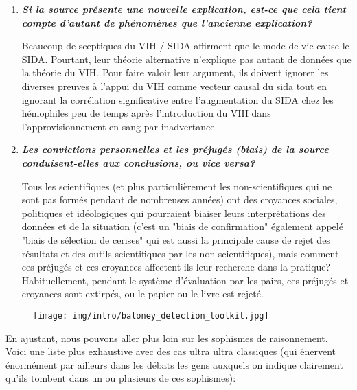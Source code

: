 \begin{enumerate}
		\item \textit{\textbf{Si la source présente une nouvelle explication, est-ce que cela tient compte d'autant de phénomènes que l'ancienne explication?}}
	
		Beaucoup de sceptiques du VIH / SIDA affirment que le mode de vie cause le SIDA. Pourtant, leur théorie alternative n'explique pas autant de données que la théorie du VIH. Pour faire valoir leur argument, ils doivent ignorer les diverses preuves à l'appui du VIH comme vecteur causal du sida tout en ignorant la corrélation significative entre l'augmentation du SIDA chez les hémophiles peu de temps après l'introduction du VIH dans l'approvisionnement en sang par inadvertance.

		\item \textit{\textbf{Les convictions personnelles et les préjugés (biais) de la source conduisent-elles aux conclusions, ou vice versa?}}

		Tous les scientifiques (et plus particulièrement les non-scientifiques qui ne sont pas formés pendant de nombreuses années) ont des croyances sociales, politiques et idéologiques qui pourraient biaiser leurs interprétations des données et de la situation (c'est un "biais de confirmation" également appelé "biais de sélection de cerises" qui est aussi la principale cause de rejet des résultats et des outils scientifiques par les non-scientifiques), mais comment ces préjugés et ces croyances affectent-ils leur recherche dans la pratique? Habituellement, pendant le système d'évaluation par les pairs, ces préjugés et croyances sont extirpés, ou le papier ou le livre est rejeté. 
	\end{enumerate}
	\begin{figure}[H]
		\centering
		\texttt{[image: img/intro/baloney\_detection\_toolkit.jpg]}
	\end{figure}
	En ajustant, nous pouvons aller plus loin sur les sophismes de raisonnement. Voici une liste plus exhaustive avec des cas ultra ultra classiques (qui énervent énormément par ailleurs dans les débats les gens auxquels on indique clairement qu'ils tombent dans un ou plusieurs de ces sophismes):
